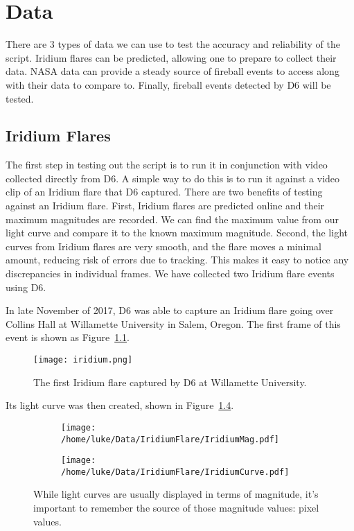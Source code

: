 \chapter{Data}

There are 3 types of data we can use to test the accuracy and reliability of the script. Iridium flares can be predicted, allowing one to prepare to collect their data. NASA data can provide a steady source of fireball events to access along with their data to compare to. Finally, fireball events detected by D6 will be tested.

\section{Iridium Flares}

The first step in testing out the script is to run it in conjunction with video collected directly from D6. A simple way to do this is to run it against a video clip of an Iridium flare that D6 captured. There are two benefits of testing against an Iridium flare. First, Iridium flares are predicted online and their maximum magnitudes are recorded. We can find the maximum value from our light curve and compare it to the known maximum magnitude. Second, the light curves from Iridium flares are very smooth, and the flare moves a minimal amount, reducing risk of errors due to tracking. This makes it easy to notice any discrepancies in individual frames. We have collected two Iridium flare events using D6. 

In late November of 2017, D6 was able to capture an Iridium flare going over Collins Hall at Willamette University in Salem, Oregon. The first frame of this event is shown as Figure~\ref{fig:Iridium}.
\begin{figure}[ht!]
	\centering
	\texttt{[image: iridium.png]}
	\caption{The first Iridium flare captured by D6 at Willamette University.}
	\label{fig:Iridium}
\end{figure}
 Its light curve was then created, shown in Figure~\ref{fig:IridiumCurves}.
\begin{figure}
\centering
\begin{subfigure}{.5\textwidth}
	\centering
	\texttt{[image: /home/luke/Data/IridiumFlare/IridiumMag.pdf]}
	\label{fig:Iridiummag}
\end{subfigure}%
\begin{subfigure}{.5\textwidth}
	\centering
	\texttt{[image: /home/luke/Data/IridiumFlare/IridiumCurve.pdf]}
	\label{fig:Iridiumcurve}
	\end{subfigure}
\caption{While light curves are usually displayed in terms of magnitude, it's important to remember the source of those magnitude values: pixel values.}
\label{fig:IridiumCurves}
\end{figure}

